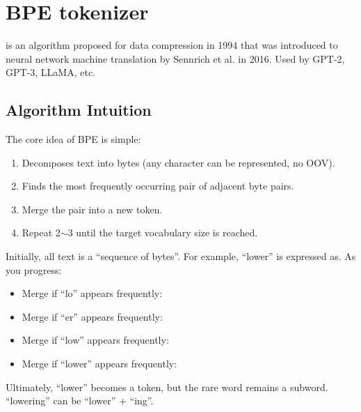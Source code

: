\section{BPE tokenizer}

is an algorithm proposed for data compression in 1994 that was introduced to neural network machine translation by Sennrich et al. in 2016. Used by GPT-2, GPT-3, LLaMA, etc.

\subsection{Algorithm Intuition}

The core idea of ​​BPE is simple:
\begin{enumerate}
\item Decomposes text into bytes (any character can be represented, no OOV).
\item Finds the most frequently occurring pair of adjacent byte pairs.
\item Merge the pair into a new token.
\item Repeat 2$\sim$3 until the target vocabulary size is reached.
\end{enumerate}

Initially, all text is a ``sequence of bytes''. For example, ``lower'' is expressed as\code{[l, o, w, e, r]}. As you progress:
\begin{itemize}
\item Merge if ``lo'' appears frequently:\code{[lo, w, e, r]}
\item Merge if ``er'' appears frequently:\code{[lo, w, er]}
\item Merge if ``low'' appears frequently:\code{[low, er]}
\item Merge if ``lower'' appears frequently:\code{[lower]}
\end{itemize}

Ultimately, ``lower'' becomes a token, but the rare word remains a subword. ``lowering'' can be ``lower'' + ``ing''.

